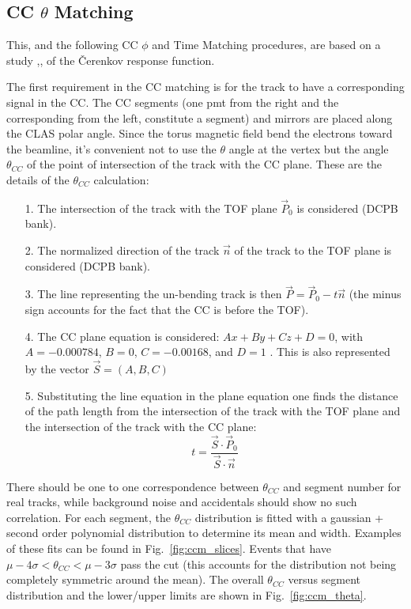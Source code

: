 \clearpage\newpage
\subsection{CC $\theta$ Matching}
This, and the following CC $\phi$ and Time Matching procedures, are based on a study
\cite{bib:ccmatch},\cite{bib:pc_fxpun}, \cite{bib:pc_osi} of the \v Cerenkov response function.

The first requirement in the CC matching is for the track to have a corresponding
signal in the CC. The CC segments (one pmt from the right and the corresponding from the left,
constitute a segment) and mirrors are placed along the CLAS polar angle.
Since the torus magnetic field bend the electrons toward the beamline, it's convenient
not to use the $\theta$ angle at the vertex but the angle $\theta_{CC}$ of the point of
intersection of the track with the CC plane. These are the details of the  $\theta_{CC}$
calculation:
\begin{itemize}
 \item [1.] The intersection of the track with the TOF plane  $\vec{P}_0$ is considered (DCPB bank).
 \item [2.] The normalized direction of the track $\vec{n}$ of the track to the TOF plane is considered (DCPB bank).
 \item [3.] The line representing the un-bending track is then $\vec{P} = \vec{P}_0 - t\vec{n}$
            (the minus sign accounts for the fact that the CC is before the TOF).
 \item [4.] The CC plane equation is considered: $Ax+By+Cz+D=0$, with
            $A=-0.000784$, $B=0$, $C=-0.00168$, and $D=1$ \cite{bib:ccmatch}. This is also represented
            by the vector $\vec{S} = (A, B, C)$
 \item [5.] Substituting the line equation in the plane equation one finds the distance of the path length from the
	         intersection of the track with the TOF plane and the intersection of the track with the CC plane:
            $$t=\frac{\vec{S} \cdot \vec{P}_0}{\vec{S} \cdot \vec{n}}$$
\end{itemize}
There should be one to one correspondence between $\theta_{CC}$ and segment number for real tracks, while
background noise and accidentals should show no such correlation.
For each segment, the $\theta_{CC}$ distribution is fitted with a gaussian + second order
polynomial distribution to determine its mean and width. Examples of these fits can be found
in Fig.~\ref{fig:ccm_slices}. Events that have $\mu - 4\sigma < \theta_{CC} < \mu - 3\sigma$
pass the cut (this accounts for the distribution not being completely symmetric around the mean).
The overall $\theta_{CC}$ versus segment distribution and the lower/upper limits
are shown in Fig.~\ref{fig:ccm_theta}.

